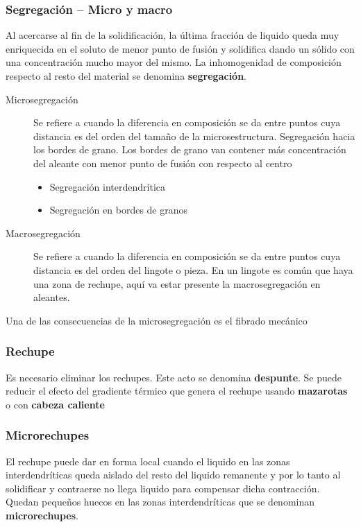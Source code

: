 \subsubsection{Segregación -- Micro y macro}

Al acercarse al fin de la solidificación, la última fracción de liquido queda muy enriquecida en el soluto de menor punto de fusión y solidifica dando un sólido con una concentración mucho mayor del mismo. La inhomogenidad de composición respecto al resto del material se denomina \textbf{segregación}. 

\begin{description}
	\item[Microsegregación] Se refiere a cuando la diferencia en composición se da entre puntos cuya distancia es del orden del tamaño de la microsestructura. Segregación hacia los bordes de grano. Los bordes de grano van contener más concentración del aleante con menor punto de fusión con respecto al centro
	\begin{itemize}
		\item Segregación interdendrítica
		\item Segregación en bordes de granos
	\end{itemize} 
	\item[Macrosegregación] Se refiere a cuando la diferencia en composición se da entre puntos cuya distancia es del orden del lingote o pieza. En un lingote es común que haya una zona de rechupe, aquí va estar presente la macrosegregación en aleantes.
\end{description}

Una de las consecuencias de la microsegregación es el fibrado mecánico

\subsubsection{Rechupe}
Es necesario eliminar los rechupes. Este acto se denomina \textbf{despunte}. Se puede reducir el efecto del gradiente térmico que genera el rechupe usando \textbf{mazarotas} o con \textbf{cabeza caliente}


\subsubsection{Microrechupes}

El rechupe puede dar en forma local cuando el liquido en las zonas interdendríticas queda aislado del resto del liquido remanente y por lo tanto al solidificar y contraerse no llega liquido para compensar dicha contracción. Quedan pequeños huecos en las zonas interdendríticas que se denominan \textbf{microrechupes}.

